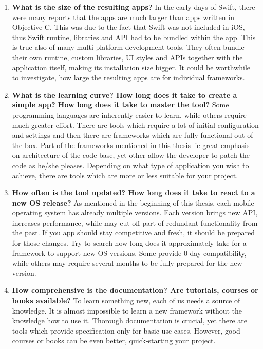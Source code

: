\documentclass[english,master,public,dept460,male,cpdeclaration,oneside]{diploma}
\begin{document}
\begin{enumerate}
	\item \textbf{What is the size of the resulting apps? }
	In the early days of Swift, there were many reports that the apps are much larger than apps written in Objective-C\cite{swiftIsBig}. This was due to the fact that Swift was not included in iOS, thus Swift runtine, libraries and API had to be bundled within the app. This is true also of many multi-platform development tools. They often bundle their own runtine, custom libraries, UI styles and APIs together with the application itself, making its installation size bigger. It could be worthwhile to investigate, how large the resulting apps are for individual frameworks.
	
	\item \textbf{What is the learning curve? How long does it take to create a simple app? How long does it take to master the tool?}
	Some programming languages are inherently easier to learn, while others require much greater effort. There are tools which require a lot of initial configuration and settings and then there are frameworks which are fully functional out-of-the-box. Part of the frameworks mentioned in this thesis lie great emphasis on architecture of the code base, yet other allow the developer to patch the code as he/she pleases. Depending on what type of application you wish to achieve, there are tools which are more or less suitable for your project.
	
	\item \textbf{How often is the tool updated? How long does it take to react to a new OS release?}
	As mentioned in the beginning of this thesis, each mobile operating system has already multiple versions. Each version brings new API, increases performance, while may cut off part of redundant functionality from the past. If you app should stay competitive and fresh, it should be prepared for those changes. Try to search how long does it approximately take for a framework to support new OS versions. Some provide 0-day compatibility, while others may require several months to be fully prepared for the new version.
	
	\item \textbf{How comprehensive is the documentation? Are tutorials, courses or books available?}
	To learn something new, each of us needs a source of knowledge. It is almost impossible to learn a new framework without the knowledge how to use it. Thorough documentation is crucial, yet there are tools which provide specification only for basic use cases. However, good courses or books can be even better, quick-starting your project.


\end{enumerate}
\end{document}
